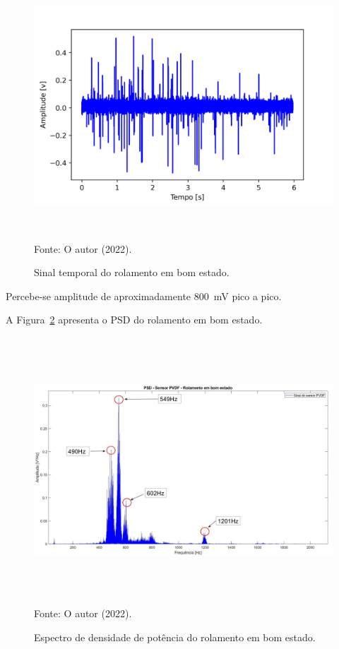 \documentclass[
	12pt,				
	oneside,			
	a4paper,			
	english,			
	brazil,			
	]{abntex2ppgsi}
\begin{document}
{{{{{{{{{{{\begin{figure}[H]
\centering
\caption {Sinal temporal do rolamento em bom estado.}
\includegraphics[width=\textwidth,height=100mm,keepaspectratio]{aquisicao_05_rolamento_bom_10_03_2022_09h03min_ajustado_6s} \\
Fonte: O autor (2022).
\label{DOMINIO_TEMPO_ROLAMENTO_BOM}
\end{figure} 

Percebe-se amplitude de aproximadamente {\SI{800}{\milli\volt}} pico a pico.

A Figura~\ref{PSD_ROLAMENTO_BOM} apresenta o PSD do rolamento em bom estado.

\begin{figure}[H]
\centering
\caption {Espectro de densidade de potência do rolamento em bom estado.}
\includegraphics[width=\textwidth,height=100mm,keepaspectratio]{PSD_PVDF_ROLAMENTO_BOM} \\
Fonte: O autor (2022).
\label{PSD_ROLAMENTO_BOM}
\end{figure} 

}}}}}}}}}}}
\end{document}
